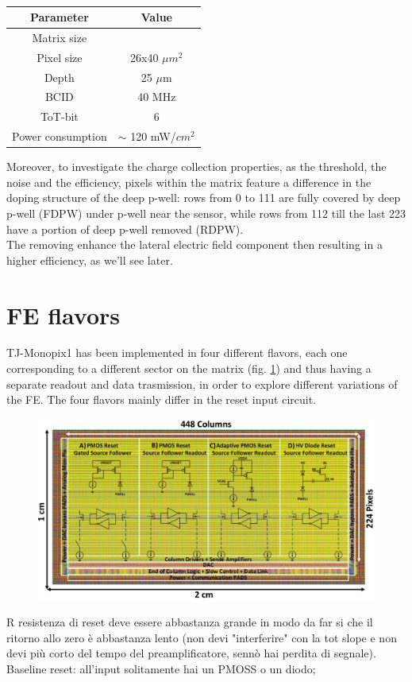     \begin{table}
        \begin{center}
        \begin{tabular}{| c |c |}
        \hline
        Parameter & Value\\
        \hline
        \hline
        Matrix size & \\
        Pixel size & 26x40 $\mu m^2$\\
        Depth & 25 $\mu$m \\
        BCID & 40 MHz \\
        ToT-bit & 6 \\
        Power consumption & $\sim$ 120 mW/$cm^2$\\
        \hline
        \end{tabular}
        \caption{}
        \label{tab:LF-TJ-Monopix}
        \end{center}
    \end{table}
    Moreover, to investigate the charge collection properties, as the threshold, the noise and the efficiency, pixels within the matrix feature a difference in the doping structure of the deep p-well: rows from 0 to 111 are fully covered by deep p-well (FDPW) under p-well near the sensor, while rows from 112 till the last 223 have a portion of deep p-well removed (RDPW). \\
    The removing enhance the lateral electric field component then resulting in a higher efficiency, as we'll see later.\\

\section{FE flavors}
    TJ-Monopix1 has been implemented in four different flavors, each one corresponding to a different sector on the matrix (fig. \ref{fig:Monopix1_flavors}) and thus having a separate readout and data trasmission, in order to explore different variations of the FE. The four flavors mainly differ in the reset input circuit.
    \begin{figure}[h!]
        \centering
        \includegraphics[width=.5\linewidth]{figures/Monopix1/Monopix1_flavors.png}
        \caption{}
        \label{fig:Monopix1_flavors}
    \end{figure}
    R resistenza di reset deve essere abbastanza grande in modo da far si che il ritorno allo zero è abbastanza lento (non devi "interferire" con la tot slope e non devi più corto del tempo del preamplificatore, sennò hai perdita di segnale).\\
    Baseline reset: all'input solitamente hai un PMOSS o un diodo;  

